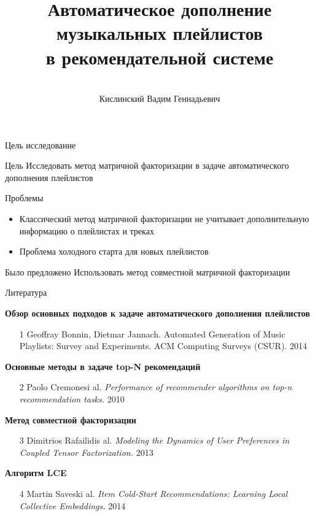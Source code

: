 \documentclass{beamer}
\title[\hbox to 56mm{Автоматическое дополнение плейлистов  \hfill\insertframenumber\,/\,\inserttotalframenumber}]
{Автоматическое дополнение музыкальных плейлистов \\ в рекомендательной системе}
\author[В.\,Г. Кислинский]{\large \\Кислинский Вадим Геннадьевич}
\institute{\large
Московский физико-технический институт}
\date{\footnotesize{\emph{Курс:} Численные методы обучения по прецедентам\par (практика, В.\,В. Стрижов)/Группа 574, весна 2018}}
\begin{document}
\begin{frame}
\titlepage
\end{frame}
\begin{frame}{Цель исследование}

\begin{block}{Цель}
Исследовать метод матричной факторизации в задаче автоматического дополнения плейлистов
\end{block}

\begin{block}{Проблемы}

\begin{itemize}
\item{Классический метод матричной факторизации не учитывает дополнительную информацию о плейлистах и треках}
\item{Проблема холодного старта для новых плейлистов}
\end{itemize}
\end{block}

\begin{block}{Было предложено}
Использовать метод совместной матричной факторизации
\end{block}
\end{frame}
\begin{frame}{Литература}

{\bf Обзор основных подходов к задаче автоматического дополнения плейлистов}
\begin{enumerate}
\item[1]Geoffray Bonnin, Dietmar Jannach. Automated Generation of Music Playlists: Survey and
Experiments. ACM Computing Surveys (CSUR). 2014
\end{enumerate}
{\bf Основные методы в задаче top-{N} рекомендаций}
\begin{enumerate}
\item[2] Paolo Cremonesi al. \textit{Performance of recommender algorithms on top-n recommendation tasks.} 2010
\end{enumerate}
{\bf Метод совместной факторизации}
\begin{enumerate}
\item[3] 	Dimitrios Rafailidis al. \textit{Modeling the Dynamics of User Preferences in Coupled Tensor Factorization.}  2013
\end{enumerate}
{\bf Алгоритм LCE}
\begin{enumerate}
\item[4]Martin Saveski al. \textit{ Item Cold-Start Recommendations:
Learning Local Collective Embeddings.} 2014
\end{enumerate}
\end{frame}
\end{document}
